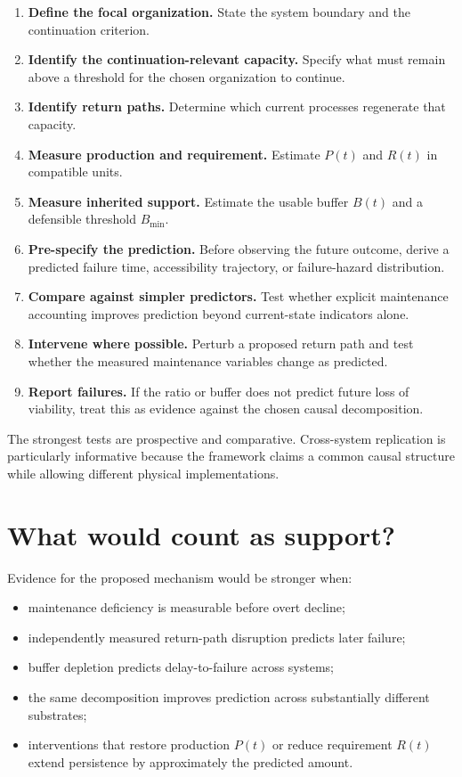 \documentclass[11pt,a4paper]{article}
\begin{document}
\begin{enumerate}
    \item \textbf{Define the focal organization.} State the system boundary and the continuation criterion.
    \item \textbf{Identify the continuation-relevant capacity.} Specify what must remain above a threshold for the chosen organization to continue.
    \item \textbf{Identify return paths.} Determine which current processes regenerate that capacity.
    \item \textbf{Measure production and requirement.} Estimate $P(t)$ and $R(t)$ in compatible units.
    \item \textbf{Measure inherited support.} Estimate the usable buffer $B(t)$ and a defensible threshold $B_{\min}$.
    \item \textbf{Pre-specify the prediction.} Before observing the future outcome, derive a predicted failure time, accessibility trajectory, or failure-hazard distribution.
    \item \textbf{Compare against simpler predictors.} Test whether explicit maintenance accounting improves prediction beyond current-state indicators alone.
    \item \textbf{Intervene where possible.} Perturb a proposed return path and test whether the measured maintenance variables change as predicted.
    \item \textbf{Report failures.} If the ratio or buffer does not predict future loss of viability, treat this as evidence against the chosen causal decomposition.
\end{enumerate}

The strongest tests are prospective and comparative. Cross-system replication is particularly informative because the framework claims a common causal structure while allowing different physical implementations.

\section{What would count as support?}

Evidence for the proposed mechanism would be stronger when:
\begin{itemize}[nosep]
    \item maintenance deficiency is measurable before overt decline;
    \item independently measured return-path disruption predicts later failure;
    \item buffer depletion predicts delay-to-failure across systems;
    \item the same decomposition improves prediction across substantially different substrates;
    \item interventions that restore production $P(t)$ or reduce requirement $R(t)$ extend persistence by approximately the predicted amount.
\end{itemize}
\end{document}
